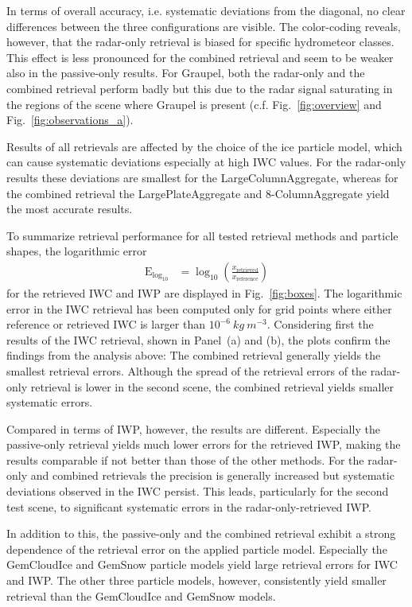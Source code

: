 \documentclass[journal abbreviation, manuscript]{copernicus}
\begin{document}
In terms of overall accuracy, i.e. systematic deviations from the diagonal, no
clear differences between the three configurations are visible. The color-coding
reveals, however, that the radar-only retrieval is biased for specific
hydrometeor classes. This effect is less pronounced for the combined retrieval
and seem to be weaker also in the passive-only results. For Graupel, both the
radar-only and the combined retrieval perform badly but this due to the radar
signal saturating in the regions of the scene where Graupel is present (c.f.
Fig.~\ref{fig:overview} and Fig.~\ref{fig:observations_a}).

Results of all retrievals are affected by the choice of the ice particle model,
which can cause systematic deviations especially at high IWC values. For the
radar-only results these deviations are smallest for the LargeColumnAggregate,
whereas for the combined retrieval the LargePlateAggregate and 8-ColumnAggregate
yield the most accurate results.


To summarize retrieval performance for all tested retrieval methods and particle
shapes, the logarithmic error
\begin{align}
  \text{E}_{\text{log}_{10}} &= \log_\text{10} \left (\frac{x_\text{retrieved}}{x_\text{reference}} \right )
\end{align}
for the retrieved IWC and IWP are displayed in Fig.~\ref{fig:boxes}. The
logarithmic error in the IWC retrieval has been computed only for grid points
where either reference or retrieved IWC is larger than
$10^{-6}\ \unit{kg\ m^{-3}}$. Considering first the results of the IWC
retrieval, shown in Panel~(a) and (b), the plots confirm the findings from the
analysis above: The combined retrieval generally yields the smallest retrieval
errors. Although the spread of the retrieval errors of the radar-only retrieval
is lower in the second scene, the combined retrieval yields smaller systematic
errors.

Compared in terms of IWP, however, the results are different. Especially the
passive-only retrieval yields much lower errors for the retrieved IWP, making
the results comparable if not better than those of the other methods. For the
radar-only and combined retrievals the precision is generally increased but
systematic deviations observed in the IWC persist. This leads, particularly for
the second test scene, to significant systematic errors in the
radar-only-retrieved IWP.

In addition to this, the passive-only and the combined retrieval exhibit a
strong dependence of the retrieval error on the applied particle model.
Especially the GemCloudIce and GemSnow particle models yield large retrieval
errors for IWC and IWP. The other three particle models, however, consistently
yield smaller retrieval than the GemCloudIce and GemSnow models.
\end{document}
